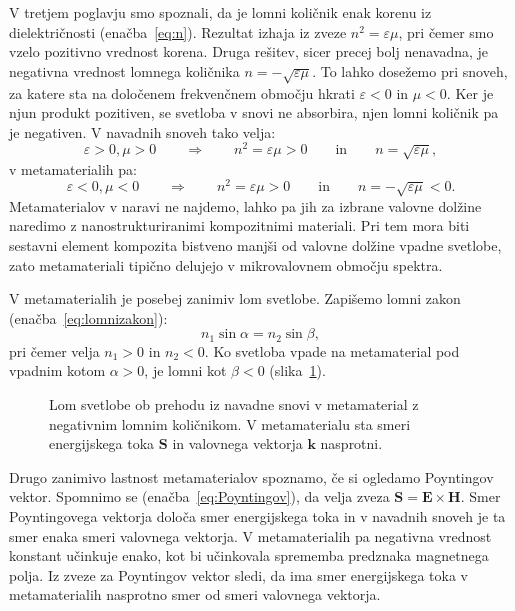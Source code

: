 V tretjem poglavju smo spoznali, da je lomni količnik enak korenu iz dielektričnosti
(enačba~\ref{eq:n}). Rezultat izhaja iz zveze $n^2 = \varepsilon \mu$, pri čemer smo 
vzelo pozitivno vrednost korena. Druga rešitev, sicer precej bolj nenavadna, je negativna
vrednost lomnega količnika $n = - \sqrt{\varepsilon \mu}$. To lahko dosežemo pri snoveh,
za katere sta na določenem frekvenčnem območju hkrati $\varepsilon<0$ in $\mu<0$. 
Ker je njun produkt pozitiven, se svetloba v snovi ne absorbira, njen lomni količnik 
pa je negativen. V navadnih snoveh tako velja:
\begin{equation}
\varepsilon >0, \mu > 0 \qquad \Rightarrow \qquad n^2 = \varepsilon \mu >0
\qquad \mathrm{in} \qquad n = \sqrt{\varepsilon\mu},
\label{eq:09_37m}
\end{equation}
v metamaterialih pa:
\begin{equation}
\varepsilon <0, \mu < 0 \qquad \Rightarrow \qquad n^2 = \varepsilon \mu >0
\qquad \mathrm{in} \qquad n = -\sqrt{\varepsilon\mu}<0. 
\label{eq:09_38}
\end{equation}
Metamaterialov v naravi ne najdemo, lahko pa jih za izbrane valovne dolžine naredimo z
nanostrukturiranimi kompozitnimi materiali. Pri tem mora biti sestavni element kompozita
bistveno manjši od valovne dolžine vpadne svetlobe, zato metamateriali tipično delujejo v 
mikrovalovnem območju spektra.

V metamaterialih je posebej zanimiv lom svetlobe. Zapišemo lomni zakon
(enačba~\ref{eq:lomnizakon}):
\begin{equation}
n_1 \sin\alpha = n_2 \sin\beta,
\label{eq:09_39}
\end{equation}
pri čemer velja $n_1>0$ in $n_2<0$. Ko svetloba vpade na metamaterial pod vpadnim
kotom $\alpha>0 $, je lomni kot $\beta <0$ (slika~\ref{fig:09_meta}). 
\begin{figure}[ht]
\centering
\def\svgwidth{80truemm} 

\caption{Lom svetlobe ob prehodu iz navadne snovi v metamaterial z negativnim lomnim
količnikom. V metamaterialu sta smeri energijskega toka $\mathbf{S}$ 
in valovnega vektorja $\mathbf{k}$ nasprotni.}
\label{fig:09_meta}
\end{figure}

Drugo zanimivo lastnost  metamaterialov spoznamo, če si ogledamo Poyntingov vektor. 
Spomnimo se (enačba~\ref{eq:Poyntingov}), da velja zveza
$\mathbf{S} = \mathbf{E}\times \mathbf{H}$. Smer Poyntingovega vektorja določa smer
energijskega toka in v navadnih snoveh je ta smer enaka smeri valovnega vektorja.
V metamaterialih pa negativna vrednost konstant učinkuje enako, kot bi učinkovala
sprememba predznaka magnetnega polja. Iz zveze za Poyntingov vektor sledi, da ima
smer energijskega toka v metamaterialih nasprotno smer od smeri valovnega vektorja. 

